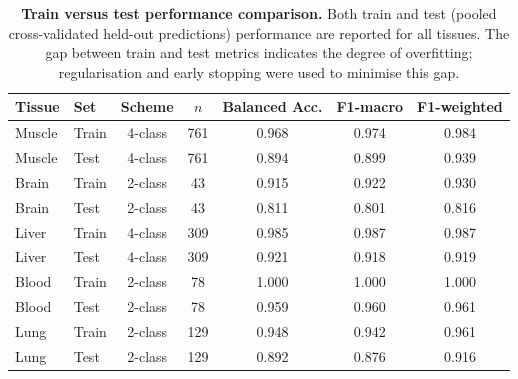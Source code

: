 \documentclass[10pt,a4paper]{article}
\begin{document}
\begin{table}[H]
  \centering
  \caption{\textbf{Train versus test performance comparison.} Both train and test (pooled cross-validated held-out predictions) performance are reported for all tissues. The gap between train and test metrics indicates the degree of overfitting; regularisation and early stopping were used to minimise this gap.}
  \label{tab:S1}
  \small
  \begin{tabular}{llccccc}
    \toprule
    Tissue & Set & Scheme & $n$ & Balanced Acc. & F1-macro & F1-weighted \\
    \midrule
    Muscle & Train & 4-class & 761 & 0.968 & 0.974 & 0.984 \\
    Muscle & Test & 4-class & 761 & 0.894 & 0.899 & 0.939 \\
    \midrule
    Brain & Train & 2-class & 43 & 0.915 & 0.922 & 0.930 \\
    Brain & Test & 2-class & 43 & 0.811 & 0.801 & 0.816 \\
    \midrule
    Liver & Train & 4-class & 309 & 0.985 & 0.987 & 0.987 \\
    Liver & Test & 4-class & 309 & 0.921 & 0.918 & 0.919 \\
    \midrule
    Blood & Train & 2-class & 78 & 1.000 & 1.000 & 1.000 \\
    Blood & Test & 2-class & 78 & 0.959 & 0.960 & 0.961 \\
    \midrule
    Lung & Train & 2-class & 129 & 0.948 & 0.942 & 0.961 \\
    Lung & Test & 2-class & 129 & 0.892 & 0.876 & 0.916 \\
    \bottomrule
  \end{tabular}
\end{table}

\vspace{2cm}
\end{document}
